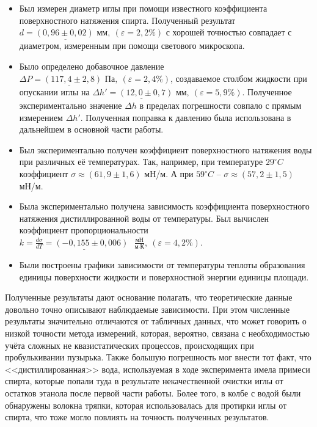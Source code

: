 \documentclass[a4paper,12pt]{article} %
\begin{document}
\begin{itemize}
	\item Был измерен диаметр иглы при помощи известного коэффициента поверхностного натяжения спирта. Полученный результат $\underline{ d = (0,96 \pm 0,02) \text{ мм},} \: (\varepsilon = 2,2\%)$ с хорошей точностью совпадает с диаметром, измеренным при помощи светового микроскопа.
	
	\item Было определено добавочное давление $ \underline{\Delta P = (117,4 \pm 2,8) \text{ Па},} \: (\varepsilon = 2,4\%)$, создаваемое столбом жидкости при опускании иглы на $ \underline{\Delta h' = (12,0 \pm 0,7) \text{ мм},} \: (\varepsilon = 5,9\%). $ Полученное экспериментально значение $ \Delta h $ в пределах погрешности совпало с прямым измерением $ \Delta h' $. Полученная поправка к давлению была использована в дальнейшем в основной части работы.
	
	\item Был экспериментально получен коэффициент поверхностного натяжения воды при различных её температурах. Так, например, при температуре $ 29 ^\circ C $ коэффициент $ \sigma \approx (61,9 \pm 1,6) $ мН/м. А при $ 59 ^\circ C $ -- $ \sigma \approx (57,2 \pm 1,5) $ мН/м.
	
	\item Была экспериментально получена зависимость коэффициента поверхностного натяжения дистиллированной воды от температуры. Был вычислен коэффициент пропорциональности $ \displaystyle \underline{k = \frac{d\sigma}{dT} = (-0,155 \pm 0,006) \text{ } \frac{\text{мН}}{\text{м}\cdot\text{К}},} \: (\varepsilon = 4,2\%). $ 
	
	\item Были построены графики зависимости от температуры теплоты образования единицы поверхности жидкости и поверхностной энергии единицы площади.
\end{itemize}

Полученные результаты дают основание полагать, что теоретические данные довольно точно описывают наблюдаемые зависимости. При этом численные результаты значительно отличаются от табличных данных, что может говорить о низкой точности метода измерений, которая, вероятно, связана с необходимостью учёта сложных не квазистатических процессов, происходящих при пробулькивании пузырька. Также большую погрешность мог внести тот факт, что <<дистиллированная>> вода, используемая в ходе эксперимента имела примеси спирта, которые попали туда в результате некачественной очистки иглы от остатков этанола после первой части работы. Более того, в колбе с водой были обнаружены волокна тряпки, которая использовалась для протирки иглы от спирта, что тоже могло повлиять на точность полученных результатов.  
\end{document}
